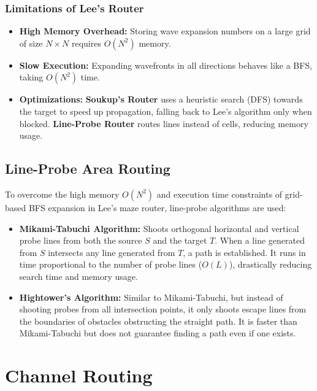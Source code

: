 \documentclass[12pt,a4paper]{article}
\begin{document}
\subsubsection{Limitations of Lee's Router}
\begin{itemize}[leftmargin=*, itemsep=2pt]
  \item \textbf{High Memory Overhead:} Storing wave expansion numbers on a large grid of size $N \times N$ requires $O(N^2)$ memory.
  \item \textbf{Slow Execution:} Expanding wavefronts in all directions behaves like a BFS, taking $O(N^2)$ time.
  \item \textbf{Optimizations:} \textbf{Soukup's Router} uses a heuristic search (DFS) towards the target to speed up propagation, falling back to Lee's algorithm only when blocked. \textbf{Line-Probe Router} routes lines instead of cells, reducing memory usage.
\end{itemize}

\subsection{Line-Probe Area Routing}
To overcome the high memory $O(N^2)$ and execution time constraints of grid-based BFS expansion in Lee's maze router, line-probe algorithms are used:
\begin{itemize}[leftmargin=*, itemsep=3pt]
  \item \textbf{Mikami-Tabuchi Algorithm:} Shoots orthogonal horizontal and vertical probe lines from both the source $S$ and the target $T$. When a line generated from $S$ intersects any line generated from $T$, a path is established. It runs in time proportional to the number of probe lines ($O(L)$), drastically reducing search time and memory usage.
  \item \textbf{Hightower's Algorithm:} Similar to Mikami-Tabuchi, but instead of shooting probes from all intersection points, it only shoots escape lines from the boundaries of obstacles obstructing the straight path. It is faster than Mikami-Tabuchi but does not guarantee finding a path even if one exists.
\end{itemize}

\section{Channel Routing}
\end{document}

